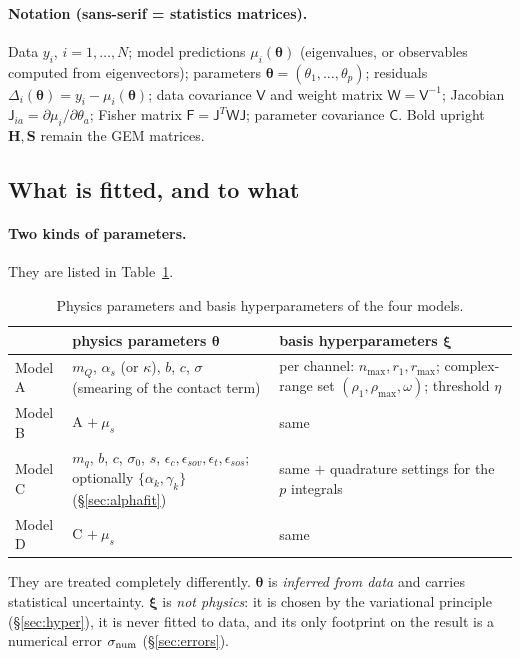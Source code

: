 \documentclass[11pt,a4paper]{article}
\numberwithin{equation}{section}
\theoremstyle{definition}
\theoremstyle{plain}
\theoremstyle{remark}
\numberwithin{algorithm}{section}
\newcommand{\as}{\alpha_s}
\newcommand{\mus}{\mu_s}
\newcommand{\mH}{\mathbf H}
\newcommand{\mS}{\mathbf S}
\newcommand{\sJ}{\mathsf J}
\newcommand{\sW}{\mathsf W}
\newcommand{\sV}{\mathsf V}
\newcommand{\sF}{\mathsf F}
\newcommand{\sC}{\mathsf C}
\newcommand{\vth}{\bm\theta}
\begin{document}
\paragraph{Notation (sans-serif = statistics matrices).} Data $y_i$, $i=1,\dots,N$; model predictions $\mu_i(\vth)$ (eigenvalues, or observables computed from eigenvectors); parameters $\vth=(\theta_1,\dots,\theta_p)$; residuals $\Delta_i(\vth)=y_i-\mu_i(\vth)$; data covariance $\sV$ and weight matrix $\sW=\sV^{-1}$; Jacobian $\sJ_{ia}=\partial\mu_i/\partial\theta_a$; Fisher matrix $\sF=\sJ^T\sW\sJ$; parameter covariance $\sC$. Bold upright $\mH,\mS$ remain the GEM matrices.

\subsection{What is fitted, and to what}\label{sec:fitsetup}
\paragraph{Two kinds of parameters.} They are listed in Table~\ref{tab:twokinds}.
\begin{table}[ht]\centering\small
\begin{tabular}{@{}p{2.6cm}p{6.5cm}p{5.6cm}@{}}\toprule
 & physics parameters $\vth$ & basis hyperparameters $\bm\xi$\\\midrule
Model A & $m_Q$, $\as$ (or $\kappa$), $b$, $c$, $\sigma$ (smearing of the contact term) & per channel: $n_{\max},r_1,r_{\max}$; complex-range set $(\rho_1,\rho_{\max},\omega)$; threshold $\eta$\\
Model B & A $+\ \mus$ & same\\
Model C & $m_q$, $b$, $c$, $\sigma_0$, $s$, $\epsilon_{c},\epsilon_{sov},\epsilon_t,\epsilon_{sos}$; optionally $\{\alpha_k,\gamma_k\}$ (\S\ref{sec:alphafit}) & same $+$ quadrature settings for the $p$ integrals\\
Model D & C $+\ \mus$ & same\\\bottomrule
\end{tabular}
\caption{Physics parameters and basis hyperparameters of the four models.}\label{tab:twokinds}
\end{table}
They are treated completely differently. $\vth$ is \emph{inferred from data} and carries statistical uncertainty. $\bm\xi$ is \emph{not physics}: it is chosen by the variational principle (\S\ref{sec:hyper}), it is never fitted to data, and its only footprint on the result is a numerical error $\sigma_{\rm num}$ (\S\ref{sec:errors}).
\end{document}
